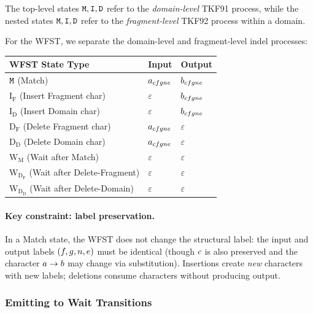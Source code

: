 The top-level states ${\tt M}, {\tt I}, {\tt D}$ refer to the \emph{domain-level} TKF91 process,
while the nested states ${\tt M}, {\tt I}, {\tt D}$ refer to the \emph{fragment-level} TKF92 process
within a domain.

For the WFST, we separate the domain-level and fragment-level indel processes:

\begin{center}
\renewcommand{\arraystretch}{1.3}
\begin{tabular}{lll}
\hline
WFST State Type & Input & Output \\
\hline
${\tt M}$ (Match) & $a_{cf gn e}$ & $b_{cf gn e}$ \\
$\mathrm{I_F}$ (Insert Fragment char) & $\varepsilon$ & $b_{cf gn e}$ \\
$\mathrm{I_D}$ (Insert Domain char) & $\varepsilon$ & $b_{cf gn e}$ \\
$\mathrm{D_F}$ (Delete Fragment char) & $a_{cf gn e}$ & $\varepsilon$ \\
$\mathrm{D_D}$ (Delete Domain char) & $a_{cf gn e}$ & $\varepsilon$ \\
$\mathrm{W_M}$ (Wait after Match) & $\varepsilon$ & $\varepsilon$ \\
$\mathrm{W_{D_F}}$ (Wait after Delete-Fragment) & $\varepsilon$ & $\varepsilon$ \\
$\mathrm{W_{D_D}}$ (Wait after Delete-Domain) & $\varepsilon$ & $\varepsilon$ \\
\hline
\end{tabular}
\end{center}

\paragraph{Key constraint: label preservation.}
In a Match state, the WFST does not change the structural label: the input and output
labels $(f, g, n, e)$ must be identical (though $c$ is also preserved and
the character $a \to b$ may change via substitution).
Insertions create \emph{new} characters with new labels; deletions consume characters
without producing output.


\subsubsection{Emitting to Wait Transitions}
\label{sec:emit-wait-transitions}

